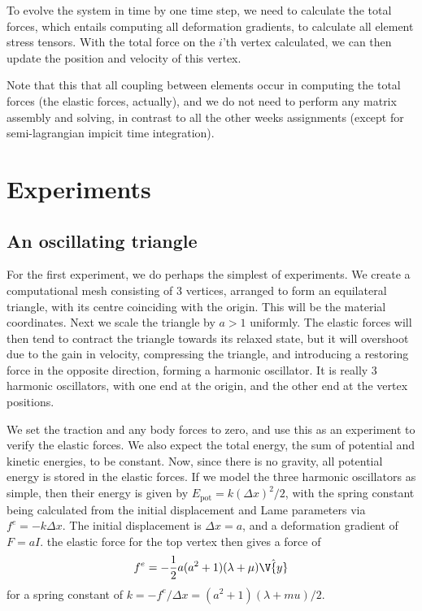 \documentclass[sigconf]{acmart}
\begin{document}
To evolve the system in time by one time step, we need to calculate the total forces, which entails computing all deformation gradients, to calculate all element stress tensors. With the total force on the $ i $'th vertex calculated, we can then update the position and velocity of this vertex.

Note that this that all coupling between elements occur in computing the total forces (the elastic forces, actually), and we do not need to perform any matrix assembly and solving, in contrast to all the other weeks assignments (except for semi-lagrangian impicit time integration).



\section{Experiments}
\subsection{An oscillating triangle}
For the first experiment, we do perhaps the simplest of experiments. We create a computational mesh consisting of 3 vertices, arranged to form an equilateral triangle, with its centre coinciding with the origin. This will be the material coordinates. Next we scale the triangle by $ a>1 $ uniformly. The elastic forces will then tend to contract the triangle towards its relaxed state, but it will overshoot due to the gain in velocity, compressing the triangle, and introducing a restoring force in the opposite direction, forming a harmonic oscillator. It is really 3 harmonic oscillators, with one end at the origin, and the other end at the vertex positions.

We set the traction and any body forces to zero, and use this as an experiment to verify the elastic forces. We also expect the total energy, the sum of potential and kinetic energies, to be constant. Now, since there is no gravity, all potential energy is stored in the elastic forces. If we model the three harmonic oscillators as simple, then their energy is given by $ E_{\text{pot}} = k(\Delta x)^2/2  $, with the spring constant being calculated from the initial displacement and Lame parameters via $ f^e=-k\Delta x $. The initial displacement is $ \Delta x = a $, and a deformation gradient of $ F=aI $. the elastic force for the top vertex then gives a force of
\begin{equation}\label{key}
	f^e = -\frac{1}{2} a(a^2+1)(\lambda+\mu)\hat{\V{y}}
\end{equation}
for a spring constant of $ k=-f^e/\Delta x = (a^2+1)(\lambda+mu)/2$.
\end{document}
